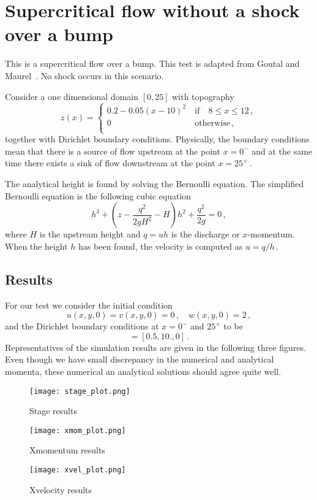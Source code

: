 
\section{Supercritical flow without a shock over a bump}

This is a supercritical flow over a bump. This test is adapted from Goutal and Maurel~\cite{GM1997}. No shock occurs in this scenario. 

Consider a one dimensional domain $[0,25]$ with topography
\begin{equation}
z(x)= \left\{ \begin{array}{ll}
 0.2-0.05\left(x-10\right)^2& ~\textrm{if}\quad 8 \leq x \leq 12\,,\\
 0 & ~\textrm{otherwise}\,,\\
\end{array} \right.
\end{equation}
together with Dirichlet boundary conditions.
Physically, the boundary conditions mean that there is a source of flow upstream at the point $x=0^{-}$ and at the same time there exists a sink of flow downstream at the point $x=25^{+}$\,.


The analytical height is found by solving the Bernoulli equation. The simplified Bernoulli equation is the following cubic equation
\begin{equation}
h^3 + \left(z - \frac{q^2}{2 g H^2} - H \right) h^2 + \frac{q^2}{2 g} = 0\,,
\end{equation}
where $H$ is the upstream height and $q=uh$ is the discharge or $x$-momentum. When the height $h$ has been found, the velocity is computed as $u=q/h$\,.

\subsection{Results}
For our test we consider the initial condition
\begin{equation}
u(x,y,0)=v(x,y,0)=0\,, \quad
w(x,y,0)= 2\,,
\end{equation}
and the Dirichlet boundary conditions at $x=0^{-}$ and $25^{+}$ to be 
\begin{equation}
[w,hu,hv]=[0.5, 10., 0]\,.
\end{equation}
Representatives of the simulation results are given in the following three figures. Even though we have small discrepancy in the numerical and analytical momenta, these numerical an analytical solutions should agree quite well.

\begin{figure}
\begin{center}
\texttt{[image: stage\_plot.png]}
\end{center}
\caption{Stage results}
\end{figure}


\begin{figure}
\begin{center}
\texttt{[image: xmom\_plot.png]}
\end{center}
\caption{Xmomentum results}
\end{figure}


\begin{figure}
\begin{center}
\texttt{[image: xvel\_plot.png]}
\end{center}
\caption{Xvelocity results}
\end{figure}


\endinput
